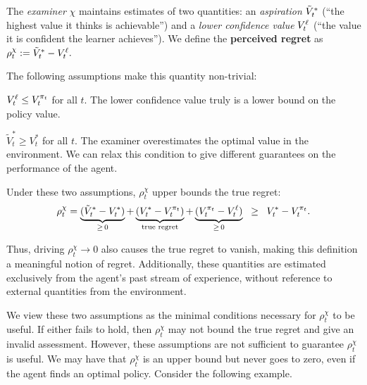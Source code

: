 \begin{highlightbox}
\begin{definition}
The \textit{examiner} $\chi$ maintains estimates of two quantities: an \emph{aspiration} $\tilde{V}^*_t$ (``the highest value it thinks is achievable'') and a \emph{lower confidence value} $V^{\ell}_t$ (``the value it is confident the learner achieves''). We define the \textbf{perceived regret} as $\rho^\chi_t := \tilde{V}^*_t - V^{\ell}_t.$ 
\end{definition}
\end{highlightbox}


The following assumptions make this quantity non-trivial:

\begin{assumption}\label{a:lb}
$V^{\ell}_t \leq V^{\pi_t}_t$ for all $t$. The lower confidence value truly is a lower bound on the policy value. 
\end{assumption}


\begin{assumption}[Optimism]\label{a:optimistic}
$\tilde{V}^*_t \geq V^{*}_t$ for all $t$. The examiner overestimates the optimal value in the environment. We can relax this condition to give different guarantees on the performance of the agent. 
\end{assumption}


\begin{proposition}[Validity]\label{prop:valid}  Under these two assumptions, $\rho^\chi_t$ upper bounds the true regret: 
\[
\rho^\chi_t = \underbrace{(\tilde{V}^*_t - V^*_t)}_{\geq\, 0} + \underbrace{(V^*_t - V^{\pi_t}_t)}_{\text{true regret}} + \underbrace{(V^{\pi_t}_t - V^{\ell}_t)}_{\geq\, 0} \;\;\geq\;\; V^*_t - V^{\pi_t}_t.
\]
    
\end{proposition}


Thus, driving $\rho^\chi_t \to 0$ also causes the true regret to vanish, making this definition a meaningful notion of regret.  
Additionally, these quantities are estimated exclusively from the agent's past stream of experience, without reference to external quantities from the environment.

We view these two assumptions as the minimal conditions necessary for $\rho^\chi_t$ to be useful. If either fails to hold, then $\rho^\chi_t$ may not bound the true regret and give an invalid assessment. 
However, these assumptions are not sufficient to guarantee $\rho^\chi_t$ is useful. We may have that $\rho^\chi_t$ is an upper bound but never goes to zero, even if the agent finds an optimal policy. Consider the following example.
\vspace{-2mm}
